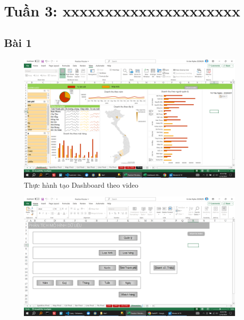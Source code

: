 \documentclass{article}
\begin{document}
\tableofcontents
\newpage
\listoffigures
\newpage
\section{Tuần 3: xxxxxxxxxxxxxxxxxxxxx}
\subsection{Bài 1}

\begin{figure}[H]
\centering
\includegraphics[scale = 0.15]{Bai1/ThucHanh/0.png}
\caption{Thực hành tạo Dashboard theo video}
\end{figure}






\begin{figure}[H]
\centering
\includegraphics[scale = 0.15]{Bai1/ThucHanh/1.png}
\end{figure}
\end{document}

